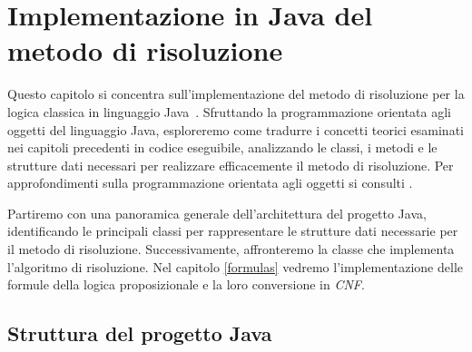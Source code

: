 \documentclass[a4paper,12pt]{report}
\begin{document}
% 
% 
\chapter{Implementazione in Java del metodo di risoluzione}
\label{impl}
Questo capitolo si concentra sull'implementazione del metodo di risoluzione per la logica classica in linguaggio Java~\cite{Java}. Sfruttando la programmazione orientata agli oggetti del linguaggio Java, esploreremo come tradurre i concetti teorici esaminati nei capitoli precedenti in codice eseguibile, analizzando le classi, i metodi e le strutture dati necessari per realizzare efficacemente il metodo di risoluzione. Per approfondimenti sulla programmazione orientata agli oggetti si consulti \cite{Liskov}.

Partiremo con una panoramica generale dell'architettura del progetto Java, identificando le principali classi per rappresentare le strutture dati necessarie per il metodo di risoluzione. Successivamente, affronteremo la classe che implementa l'algoritmo di risoluzione. Nel capitolo \ref{formulas} vedremo l'implementazione delle formule della logica proposizionale e la loro conversione in \emph{CNF}.

\section{Struttura del progetto Java}
\label{project_structure}
\end{document}
